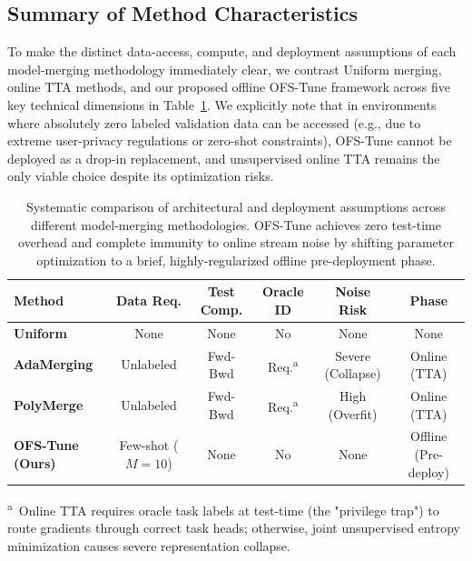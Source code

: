 \subsection{Summary of Method Characteristics}
To make the distinct data-access, compute, and deployment assumptions of each model-merging methodology immediately clear, we contrast Uniform merging, online TTA methods, and our proposed offline OFS-Tune framework across five key technical dimensions in Table~\ref{tab:method_comparison}.
We explicitly note that in environments where absolutely zero labeled validation data can be accessed (e.g., due to extreme user-privacy regulations or zero-shot constraints), OFS-Tune cannot be deployed as a drop-in replacement, and unsupervised online TTA remains the only viable choice despite its optimization risks.

\begin{table}[t]
\caption{Systematic comparison of architectural and deployment assumptions across different model-merging methodologies.
OFS-Tune achieves zero test-time overhead and complete immunity to online stream noise by shifting parameter optimization to a brief, highly-regularized offline pre-deployment phase.}
\label{tab:method_comparison}
\vskip 0.15in
\begin{center}
\begin{scriptsize}
\setlength{\tabcolsep}{2.0pt}
\begin{tabular*}{\textwidth}{@{\extracolsep{\fill}}lccccc}
\toprule
\textbf{Method} & \textbf{Data Req.} & \textbf{Test Comp.} & \textbf{Oracle ID} & \textbf{Noise Risk} & \textbf{Phase} \\
\midrule
\textbf{Uniform} & None & None & No & None & None \\
\textbf{AdaMerging} & Unlabeled & Fwd-Bwd & Req.\textsuperscript{a} & Severe (Collapse) & Online (TTA) \\
\textbf{PolyMerge} & Unlabeled & Fwd-Bwd & Req.\textsuperscript{a} & High (Overfit) & Online (TTA) \\
\textbf{OFS-Tune (Ours)} & Few-shot ($M=10$) & None & No & None & Offline (Pre-deploy) \\
\bottomrule
\end{tabular*}
\end{scriptsize}
\end{center}
\vskip -0.1in
\begin{center}
\begin{minipage}{0.9\textwidth}
\textsuperscript{a}\scriptsize{~Online TTA requires oracle task labels at test-time (the "privilege trap") to route gradients through correct task heads; otherwise, joint unsupervised entropy minimization causes severe representation collapse.}
\end{minipage}
\end{center}
\end{table}

